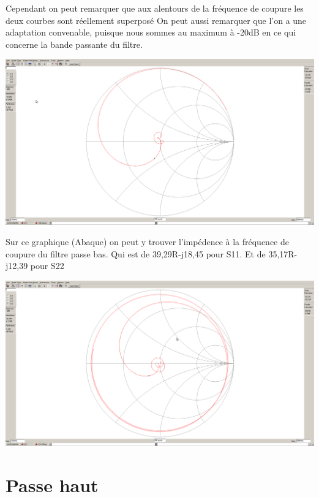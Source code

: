 \documentclass[a4paper,12pt]{report}            %
\begin{document}
Cependant on peut remarquer que aux alentours de la fréquence de coupure les deux courbes sont réellement superposé
On peut aussi remarquer que l'on a une adaptation convenable, puisque nous sommes au maximum à -20dB en
ce qui concerne la bande passante du filtre.
\begin{center}\includegraphics[scale = 0.25]{pic/Abaque_pb.png}\\ \end{center}
Sur ce graphique (Abaque) on peut y trouver l'impédence à la fréquence de coupure du filtre passe bas.
Qui est de 39,29R-j18,45 pour S11. Et de 35,17R-j12,39 pour S22
\begin{center}\includegraphics[scale = 0.25]{pic/Abaque_pbS22.png}\\ \end{center}


\section{Passe haut}
\end{document}
